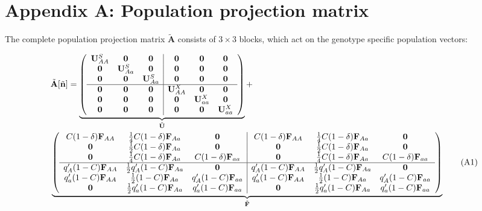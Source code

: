 \documentclass[11pt]{article}
\newcommand\numberthis{\addtocounter{equation}{1}\tag{\theequation}}
\def\mbf#1{\mathbf{#1}}
\begin{document}
\section*{Appendix A: Population projection matrix}
\renewcommand{\theequation}{A\arabic{equation}}
\setcounter{equation}{0}  %
\setcounter{table}{0}  %

The complete population projection matrix $\tilde{\mbf{A}}$ consists of $3 \times 3$ blocks, which act on the genotype specific population vectors:

{
\small

\begin{align*} \label{eq:AtildeFull}
	&\tilde{\mbf{A}}[\tilde{\mbf{n}}] = 
		 \underbrace{\left(
			\begin{array}{ccc|ccc}
				\mbf{U}^S_{AA} & \mbf{0} & \mbf{0} & \mbf{0} & \mbf{0} & \mbf{0} \\ 
				\mbf{0} & \mbf{U}^S_{Aa} & \mbf{0} & \mbf{0} & \mbf{0} & \mbf{0} \\
				\mbf{0} & \mbf{0} & \mbf{U}^S_{Aa} & \mbf{0} & \mbf{0} & \mbf{0} \\ \hline
				\mbf{0} & \mbf{0} & \mbf{0} & \mbf{U}^X_{AA} & \mbf{0} & \mbf{0} \\
				\mbf{0} & \mbf{0} & \mbf{0} & \mbf{0} & \mbf{U}^X_{aa} & \mbf{0}\\
				\mbf{0} & \mbf{0} & \mbf{0} & \mbf{0} & \mbf{0} & \mbf{U}^X_{aa}
			\end{array} \right)}_{\tilde{\mbf{U}}} + \\ 
	&\underbrace{\left(
			\begin{array}{ccc|ccc}
				C (1 - \delta) \mbf{F}_{AA} & \frac{1}{4} C (1 - \delta) \mbf{F}_{Aa} & \mbf{0} & C (1 - \delta) \mbf{F}_{AA} & \frac{1}{4} C (1 - \delta) \mbf{F}_{Aa} & \mbf{0} \\ 
				\mbf{0} & \frac{1}{2} C (1 - \delta) \mbf{F}_{Aa} & \mbf{0} & \mbf{0} & \frac{1}{2} C (1 - \delta) \mbf{F}_{Aa} & \mbf{0}  \\
				\mbf{0} & \frac{1}{4} C (1 - \delta) \mbf{F}_{Aa} & C (1 - \delta) \mbf{F}_{aa} & \mbf{0} & \frac{1}{4} C (1 - \delta) \mbf{F}_{Aa} & C (1 - \delta) \mbf{F}_{aa} \\ \hline
				q^{\prime}_{A} (1 - C)\mbf{F}_{AA} & \frac{1}{2} q^{\prime}_{A} (1 - C)\mbf{F}_{Aa}  & \mbf{0} & q^{\prime}_{A} (1 - C) \mbf{F}_{AA}& \frac{1}{2} q^{\prime}_{A} (1 - C) \mbf{F}_{Aa} & \mbf{0} \\
				q^{\prime}_{a} (1 - C) \mbf{F}_{AA} & \frac{1}{2} (1 - C)\mbf{F}_{Aa}  & q^{\prime}_{A} (1 - C)\mbf{F}_{aa}  & q^{\prime}_{a} (1 - C) \mbf{F}_{AA} & \frac{1}{2}(1 - C) \mbf{F}_{Aa}  & q^{\prime}_{A} (1 - C)\mbf{F}_{aa}  \\
				\mbf{0} & \frac{1}{2} q^{\prime}_{a} (1 - C)\mbf{F}_{Aa} & q^{\prime}_{a} (1 - C) \mbf{F}_{aa} & \mbf{0} & \frac{1}{2} q^{\prime}_{a} (1 - C)\mbf{F}_{Aa} & q^{\prime}_{a} (1 - C)\mbf{F}_{aa} 
			\end{array} \right)}_{\tilde{\mbf{F}}} \numberthis
\end{align*}

}
\end{document}
